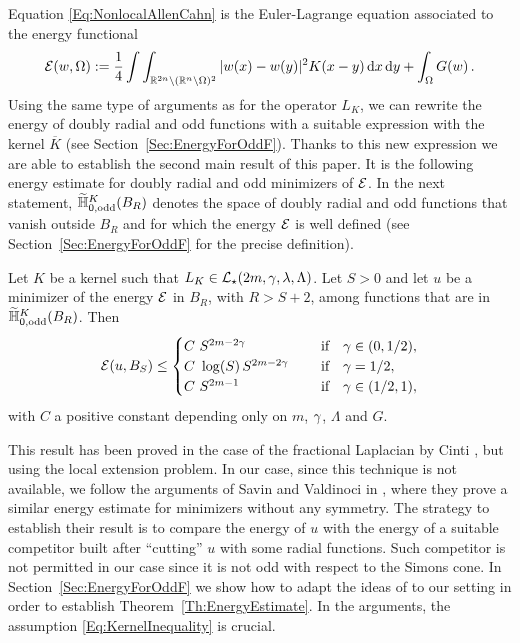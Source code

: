 Equation \eqref{Eq:NonlocalAllenCahn} is the Euler-Lagrange equation associated to the energy functional
\begin{equation}
\label{Eq:Energy}
\mathcal{E}(w, \Omega) := \dfrac{1}{4}\int\int_{\mathbb{R}^{2n} \setminus (\mathbb{R}^n\setminus\Omega)^2} |w(x) - w(y)|^2 K(x-y) \,\mathrm{d} x \,\mathrm{d} y + \int_{\Omega} G(w)\,.
\end{equation}
Using the same type of arguments as for the operator $L_K$, we can rewrite the energy of doubly radial and odd functions with a suitable expression with the kernel $\overline{K}$ (see Section~\ref{Sec:EnergyForOddF}). Thanks to this new expression we are able to establish the second main result of this paper. It is the following energy estimate for doubly radial and odd minimizers of $\mathcal{E}$. In the next statement, $\widetilde{\mathbb{H}}^K_{0, \mathrm{odd}}(B_R)$ denotes the space of doubly radial and odd functions that vanish outside $B_R$ and for which the energy $\mathcal{E}$ is well defined (see Section~\ref{Sec:EnergyForOddF} for the precise definition).

\begin{theorem}
	\label{Th:EnergyEstimate} 
	Let $K$ be a kernel such that $L_K\in \mathcal{L}_\star(2m, \gamma, \lambda, \Lambda)$. Let $S>0$ and let $u$ be a minimizer of the energy $\mathcal{E}$ in $B_{R}$, with $R>S+2$, among functions that are in $\widetilde{\mathbb{H}}^K_{0, \mathrm{odd}}(B_R)$. Then
	$$ \mathcal{E} (u,B_S) \leq \begin{cases}
	C \ S^{2m-2\gamma}\ \ \ \ &\textrm{if } \ \ \gamma\in(0,1/2),\\
	C\ \log(S)\,S^{2m-2\gamma}\ \ \ \ &\textrm{if } \ \ \gamma=1/2,\\
	C \ S^{2m-1}\ \ \ \ &\textrm{if } \ \ \gamma\in(1/2,1),\\
	\end{cases} $$
	with $C$ a positive constant depending only on $m$, $\gamma$, $\Lambda$ and $G$.
\end{theorem}



This result has been proved in the case of the fractional Laplacian by Cinti \cite{Cinti-Saddle,Cinti-Saddle2}, but using the local extension problem. In our case, since this technique is not available, we follow the arguments of Savin and Valdinoci in \cite{SavinValdinoci-EnergyEstimate}, where they prove a similar energy estimate for minimizers without any symmetry. The strategy to establish their result is to compare the energy of $u$ with the energy of a suitable competitor built after ``cutting'' $u$ with some radial functions. Such competitor is not permitted in our case since it is not odd with respect to the Simons cone. In Section~\ref{Sec:EnergyForOddF} we show how to adapt the ideas of \cite{SavinValdinoci-EnergyEstimate} to our setting in order to establish Theorem~\ref{Th:EnergyEstimate}. In the arguments, the assumption \eqref{Eq:KernelInequality} is crucial.



